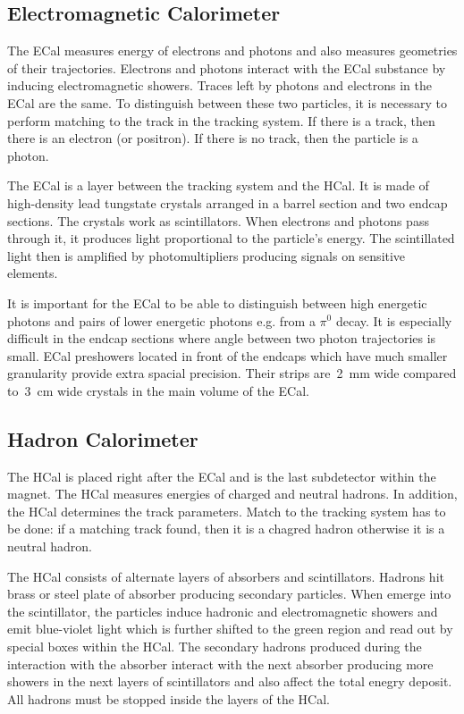 \subsection{Electromagnetic Calorimeter}

The ECal measures energy of electrons and photons and also measures geometries of their trajectories. Electrons and photons interact with the ECal substance by inducing electromagnetic showers. Traces left by photons and electrons in the ECal are the same. To distinguish between these two particles, it is necessary to perform matching to the track in the tracking system. If there is a track, then there is an electron (or positron). If there is no track, then the particle is a photon.

The ECal is a layer between the tracking system and the HCal. It is made of high-density lead tungstate crystals arranged in a barrel section and two endcap sections. The crystals work as scintillators. When electrons and photons pass through it, it produces light proportional to the particle's energy. The scintillated light then is amplified by photomultipliers producing signals on sensitive elements.

It is important for the ECal to be able to distinguish between high energetic photons and pairs of lower energetic photons e.g. from a $\pi^0$ decay. It is especially difficult in the endcap sections where angle between two photon trajectories is small. ECal preshowers located in front of the endcaps which have much smaller granularity provide extra spacial precision. Their strips are~2~mm wide compared to~3~cm wide crystals in the main volume of the ECal.


\subsection{Hadron Calorimeter}

The HCal is placed right after the ECal and is the last subdetector within the magnet. The HCal measures energies of charged and neutral hadrons. In addition, the HCal determines the track parameters. Match to the tracking system has to be done: if a matching track found, then it is a chagred hadron otherwise it is a neutral hadron. 

The HCal consists of alternate layers of absorbers and scintillators. Hadrons hit brass or steel plate of absorber producing secondary particles. When emerge into the scintillator, the particles induce hadronic and electromagnetic showers and emit blue-violet light which is further shifted to the green region and read out by special boxes within the HCal. The secondary hadrons produced during the interaction with the absorber interact with the next absorber producing more showers in the next layers of scintillators and also affect the total enegry deposit. All hadrons must be stopped inside the layers of the HCal.

